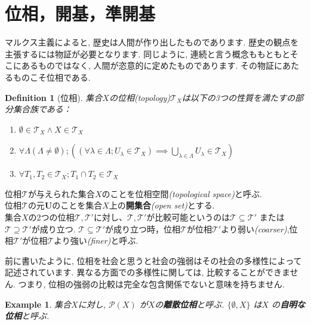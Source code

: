 \documentclass[dvipdfmx]{jbook}
\newtheorem{definition}[theorem]{Definition}
\theoremstyle{remark}
\theoremstyle{plain}
\newtheorem{example}[theorem]{Example}
\begin{document}
\section{位相，開基，準開基}

マルクス主義によると, 歴史は人間が作り出したものであります. 歴史の観点を主張するには物証が必要となります.
同じように, 連続と言う概念ももともとそこにあるものではなく, 人間が恣意的に定めたものであります. その物証にあたるものこそ位相である. 


\begin{definition}[位相]
	集合$X$の位相\textit{(topology)}$\mathcal{T}_X$は以下の3つの性質を満たすの部分集合族である：

	\begin{enumerate}
		\item $\emptyset \in \mathcal{T}_X \land X \in \mathcal{T}_X$
		\item $\forall \Lambda\left( \Lambda \neq \emptyset \right) ;\left( \left( \forall \lambda \in \Lambda; U_{\lambda} \in \mathcal{T}_X \right) \implies \bigcup_{\lambda \in \Lambda} U_{\lambda} \in \mathcal{T}_X \right) $ 
		\item $\forall T_1, T_2 \in \mathcal{T}_X; T_1\cap T_2 \in \mathcal{T}_X$
	\end{enumerate}

\end{definition}


位相$\mathcal{T}$が与えられた集合$X$のことを位相空間\textit{(topological space)}と呼ぶ.\\
位相$\mathcal{T}$の元$\mathbf{U}$のことを集合$X$上の\textbf{開集合}\textit{(open set)}とする.\\
集合$X$の2つの位相$\mathcal{T},\mathcal{T}'$に対し、$\mathcal{T},\mathcal{T}'$が比較可能というのは$\mathcal{T} \subseteq \mathcal{T}' $ または$ \mathcal{T} \supseteq \mathcal{T}'$が成り立つ.
$\mathcal{T} \subseteq \mathcal{T}'$が成り立つ時，位相$\mathcal{T}$が位相$\mathcal{T}'$より弱い\textit{(coarser)},位相$\mathcal{T}'$が位相$\mathcal{T}$より強い\textit{(finer)}と呼ぶ.

前に書いたように, 位相を社会と思うと社会の強弱はその社会の多様性によって記述されています. 異なる方面での多様性に関しては, 比較することができません. つまり, 位相の強弱の比較は完全な包含関係でないと意味を持ちません.

\begin{example}
	集合$X$に対し, $\mathcal{P}\left( X \right) $ が$X$の\textbf{離散位相}と呼ぶ. $\{\emptyset , X\} $ は$X$ の\textbf{自明な位相}と呼ぶ.
\end{example}
\end{document}
